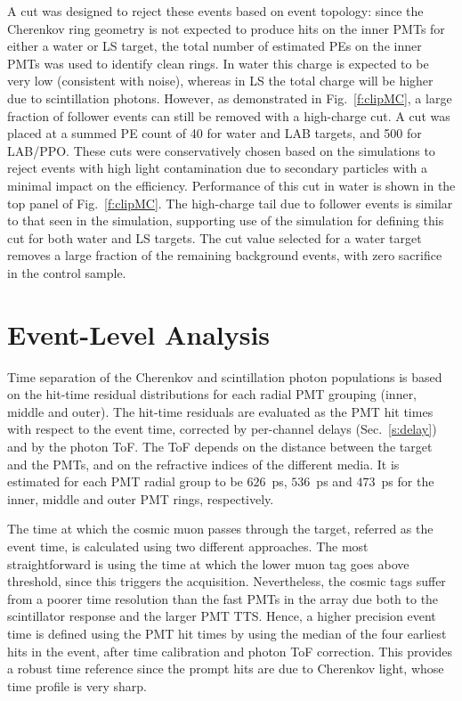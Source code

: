 A cut was designed to reject these events based on event topology: since the Cherenkov ring geometry is not expected to produce hits on the inner PMTs for either a water or LS target, the total number of estimated PEs on the inner PMTs was used to identify clean rings.   In water this charge is expected to be very low (consistent with noise), whereas in LS the total charge will be higher due to scintillation photons.  However, as demonstrated in Fig.~\ref{f:clipMC}, a large fraction of follower events can still be removed with a high-charge cut.   
A cut was placed at a summed PE count of 40 for water and LAB targets, and 500 for LAB/PPO.  
These cuts were conservatively chosen based on the simulations to reject events with high light contamination due to secondary particles with a minimal impact on the efficiency. 
Performance of this cut in water is shown in 
the top panel of Fig.~\ref{f:clipMC}.  The high-charge tail due to follower events is similar to that seen in the simulation, supporting use of the simulation for defining this cut for both water and LS targets. The  cut value selected for a water target removes a large fraction of the remaining background events, with zero sacrifice in the control sample.  

\section{Event-Level Analysis}\label{s:recon}

Time separation of the Cherenkov and scintillation photon populations is based on the hit-time residual distributions for each radial PMT grouping (inner, middle and outer).  The hit-time residuals are evaluated as the PMT hit times with respect to the event time, corrected by per-channel delays (Sec.~\ref{s:delay}) and by the photon ToF.  
The ToF depends on the distance between the target and the PMTs, and on the refractive indices of the different media. It is estimated for each PMT radial group to be $626$~ps, $536$~ps and $473$~ps for the inner, middle and outer PMT rings, respectively.

The time at which the cosmic muon passes through the target, referred as the event time, is calculated using two different approaches. The most straightforward is using the time at which the lower muon tag goes above threshold, since this  triggers the acquisition. Nevertheless, the cosmic tags suffer from a poorer time resolution than the fast PMTs in the array due both to the scintillator response and the larger PMT TTS. 
Hence, a higher precision event time is defined using the PMT hit times by using the median of the four earliest hits in the event, after time calibration and photon ToF correction. This provides a robust time reference since the prompt hits are due to Cherenkov light, whose time profile is very sharp.  

